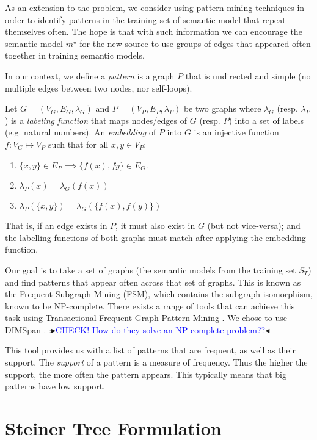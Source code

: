 \documentclass[letterpaper]{article} %
\newcommand{\authornote}[3]{
  {\fbox{\sc 
  #1}:$\blacktriangleright$\textcolor{#2}{\small{#3}}$\blacktriangleleft$}%
}
\newcommand{\ddg}[1]{\authornote{DDG}{blue}{#1}}
\begin{document}
As an extension to the problem, we consider using pattern mining techniques in 
order to identify patterns in the training set of semantic model that repeat 
themselves often. The hope is that with such information we can encourage the 
semantic model $m^\star$ for the new source to use groups of edges that 
appeared often together in training semantic models.

In our context, we define a \emph{pattern} is a graph $P$ that is undirected 
and simple (no multiple edges between two nodes, nor self-loops).

Let $G = (V_G,E_G,\lambda_G)$ and $P = (V_P,E_P, \lambda_P)$ be two graphs 
where $\lambda_G$ (resp. $\lambda_P$) is a \emph{labeling function} that maps 
nodes/edges of $G$ (resp. $P$) into a set of labels (e.g. natural numbers).
An \emph{embedding} of $P$ into $G$ is an injective function $f : V_G \mapsto 
V_P$ such that for all $x,y \in V_P$:
\begin{enumerate}
	\item $\{x,y\} \in E_P \implies \{f(x),f{y}\} \in E_G$.
	\item $\lambda_P(x) = \lambda_G(f(x))$
	\item $\lambda_P(\{x,y\}) = \lambda_G(\{f(x),f(y)\})$
\end{enumerate} 
That is, if an edge exists in $P$, it must also exist in $G$ (but not 
vice-versa); and the labelling functions of both graphs must match after 
applying the embedding function.

Our goal is to take a set of graphs (the semantic models from the training set 
$S_T$) and find patterns that appear often across that set of graphs. This is 
known as the Frequent Subgraph Mining (FSM), which contains the subgraph 
isomorphism, known to be NP-complete. 
There exists a range of tools that can achieve this task using Transactional 
Frequent Graph Pattern Mining
\cite{petermann2017dimspan,yan2002gspan}. We chose to use DIMSpan 
\cite{petermann2017dimspan}. \ddg{CHECK! How do they solve an NP-complete 
problem??}

This tool provides us with a list of patterns that are frequent, as well as 
their support. The \emph{support} of a pattern is a measure of frequency. Thus 
the higher the support, the more often the pattern appears. This typically 
means that big patterns have low support.

 

\section{Steiner Tree Formulation \label{SEC:STP}}
\end{document}
